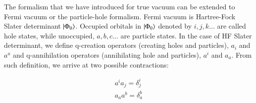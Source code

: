 \documentclass[journal=jacsat]{achemso}
\numberwithin{equation}{section}
\begin{document}
The formalism that we have introduced for true vacuum can be extended to Fermi vacuum or the particle-hole formalism. Fermi vacuum is Hartree-Fock Slater determinant $\ket{\Phi_{0}}$. Occupied orbitals in $\ket{\Phi_{0}}$ denoted by $i,j,k...$ are called hole states, while unoccupied, $a,b,c...$ are particle states. In the case of HF Slater determinant, we define q-creation operators (creating holes and particles), $a_{i}$ and $a^{a}$ and q-annihilation operators (annihilating hole and particles), $a^{i}$ and $a_{a}$. From such definition, we arrive at two possible contractions:

\begin{align}
a^{i}a_{j}=\delta^{i}_{j}\\
a_{a}a^{b}=\delta^{b}_{a}
\end{align}
\end{document}
